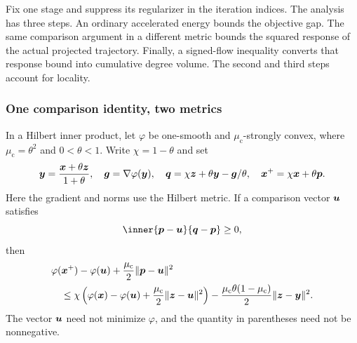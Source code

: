 Fix one stage and suppress its regularizer in the iteration indices.
The analysis has three steps. An ordinary accelerated energy bounds the
objective gap. The same comparison argument in a different metric bounds
the squared response of the actual projected trajectory. Finally, a
signed-flow inequality converts that response bound into cumulative degree
volume. The second and third steps account for locality.

\subsubsection{One comparison identity, two metrics}

\begin{lemma}
\label{lem:det-comparison}
In a Hilbert inner product, let $\varphi$ be one-smooth and
$\mu_{\mathrm{c}}$-strongly convex, where $\mu_{\mathrm{c}}=\theta^2$ and
$0<\theta<1$. Write $\chi=1-\theta$ and set
\[
 \bm{y}=\frac{\bm{x}+\theta\bm{z}}{1+\theta},\quad
 \bm{g}=\nabla\varphi(\bm{y}),\quad
 \bm{q}=\chi\bm{z}+\theta\bm{y}-\bm{g}/\theta,\quad
 \bm{x}^+=\chi\bm{x}+\theta\bm{p}.
\]
Here the gradient and norms use the Hilbert metric. If a comparison vector
$\bm{u}$ satisfies
\begin{equation}
 \inner{\vp-\vu}{\vq-\vp}\geq0,
 \label{eq:det-comparison-sector}
\end{equation}
then
\begin{align*}
 &\varphi(\bm{x}^+)-\varphi(\bm{u})
       +\frac{\mu_{\mathrm{c}}}2\lVert\bm{p}-\bm{u}\rVert^2\\
 &\quad\leq\chi\left(\varphi(\bm{x})-\varphi(\bm{u})
       +\frac{\mu_{\mathrm{c}}}2\lVert\bm{z}-\bm{u}\rVert^2\right)
       -\frac{\mu_{\mathrm{c}}\theta(1-\mu_{\mathrm{c}})}2
        \lVert\bm{z}-\bm{y}\rVert^2.
\end{align*}
The vector $\bm{u}$ need not minimize $\varphi$, and the quantity in
parentheses need not be nonnegative.
\end{lemma}
